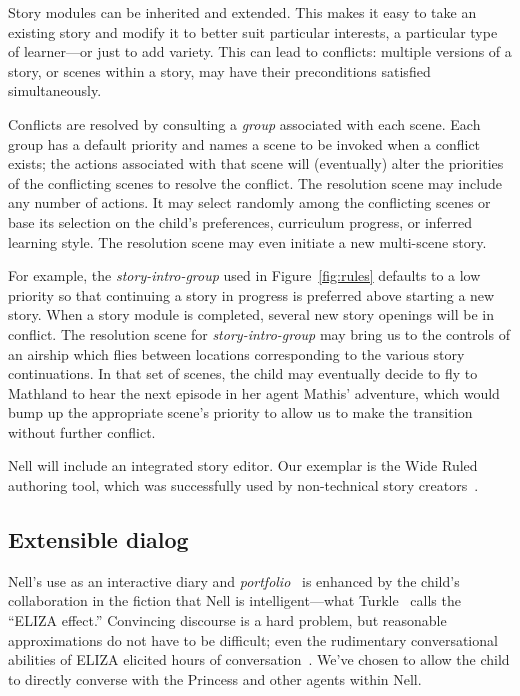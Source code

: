 \documentclass[preprint]{sig-alternate}
\begin{document}
Story modules can be inherited and extended.
This makes it easy to take an existing story and modify it to
better suit particular interests, a particular type of learner---or
just to add variety.  This can lead to conflicts: multiple versions of
a story, or scenes within a story, may have their
preconditions satisfied simultaneously.

Conflicts are resolved by consulting a \textit{group} associated with
each scene.  Each group has a default priority and names a scene to be
invoked when a conflict exists; the actions associated with that scene
will (eventually) alter the priorities of the conflicting scenes to
resolve the conflict.  The resolution scene may include any number of
actions.  It may select randomly among the conflicting scenes or base
its selection on the
child's preferences, curriculum progress, or inferred learning style.
The resolution scene may even initiate a new multi-scene story.

For example, the \textit{story-intro-group}
used in Figure~\ref{fig:rules} defaults to a low priority so that
continuing a story in progress is preferred above starting a new story.
When a story module is completed, several new story openings will be in
conflict.  The resolution scene for \textit{story-intro-group} may bring us
to the controls of an airship which flies between locations
corresponding to the various story continuations.  In that set of
scenes, the child may eventually decide to fly to Mathland to hear the
next episode in her agent Mathis' adventure, which would bump up the
appropriate scene's priority to allow us to make the transition
without further conflict.

Nell will include an integrated story editor.  Our exemplar is
the Wide Ruled authoring tool, which was successfully used by
non-technical story creators~\cite{skorupski:2009}.


\subsection{Extensible dialog}
Nell's use as an interactive diary and
\textit{portfolio}~\cite{stefanakis:portfolios} is enhanced by the child's
collaboration in the fiction that Nell is intelligent---what
Turkle~\cite{turkle:alone} calls the ``ELIZA effect.''
Convincing discourse is a hard problem, but
reasonable approximations do not have to be difficult; even
the rudimentary conversational abilities of ELIZA elicited hours of
conversation~\cite{weizenbaum:power}.
We've chosen to allow the child to directly converse with the
Princess and other agents within Nell.
\end{document}
